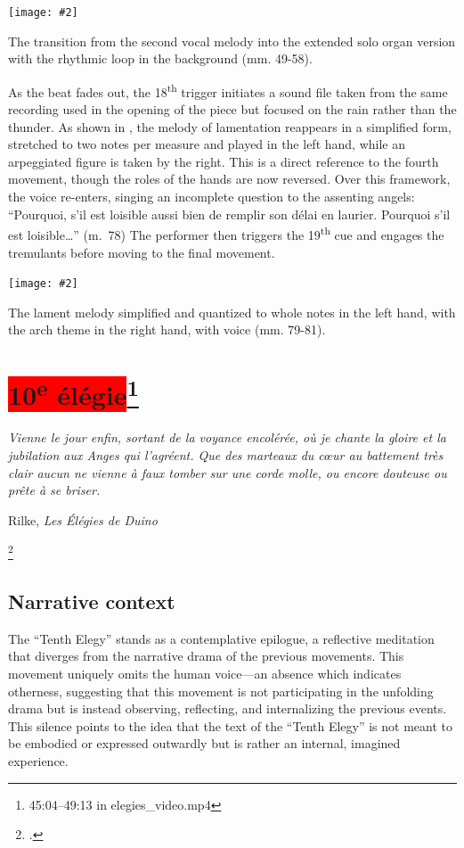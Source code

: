 \documentclass[12pt,twoside,maitrise]{dms_ks}
\newcommand{\customincludeexamples}[4][]{%
    \begin{example}[H]
        \centering
        \texttt{[image: \#2]}
        \caption{#4}
	\label{#3} 
    \end{example}
}
\theoremstyle{definition}
\begin{document}
{\customincludeexamples[width=\textwidth]{9e_2}{ex:9e_2}{The transition from the second vocal melody into the extended solo organ version with the rhythmic loop in the background (mm. 49-58).}

As the beat fades out, the 18\textsuperscript{th} trigger initiates a sound file taken from the same recording used in the opening of the piece but focused on the rain rather than the thunder. 
As shown in , the melody of lamentation reappears in a simplified form, stretched to two notes per measure and played in the left hand, while an arpeggiated figure is taken by the right. 
This is a direct reference to the fourth movement, though the roles of the hands are now reversed. 
Over this framework, the voice re-enters, singing an incomplete question to the assenting angels: “Pourquoi, s'il est loisible aussi bien de remplir son délai en laurier. Pourquoi s'il est loisible…” (m.~78)
The performer then triggers the 19\textsuperscript{th} cue and engages the tremulants before moving to the final movement. 

\customincludeexamples[width=\textwidth]{9e_3}{ex:9e_3}{The lament melody simplified and quantized to whole notes in the left hand, with the arch theme in the right hand, with voice (mm. 79-81).}

\section{\colorbox{red}{10\textsuperscript{e} élégie}\footnote{45:04--49:13 in elegies\_video.mp4}}

\epigraph{\textit{Vienne le jour enfin, sortant de la voyance encolérée, où je chante la gloire et la jubilation aux Anges qui l’agréent. Que des marteaux du cœur au battement très clair aucun ne vienne à faux tomber sur une corde molle, ou encore douteuse ou prête à se briser.}}{Rilke, \textit{Les Élégies de Duino}\protect\footnotemark}

\footcitetext[91]{rilke_egies_1986}

\subsection{Narrative context}

The “Tenth Elegy” stands as a contemplative epilogue, a reflective meditation that diverges from the narrative drama of the previous movements. 
This movement uniquely omits the human voice---an absence which indicates otherness, suggesting that this movement is not participating in the unfolding drama but is instead observing, reflecting, and internalizing the previous events. 
This silence points to the idea that the text of the “Tenth Elegy” is not meant to be embodied or expressed outwardly but is rather an internal, imagined experience.

}
\end{document}
